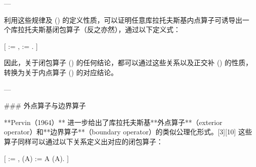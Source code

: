 ---

利用这些规律及 () 的定义性质，可以证明任意库拉托夫斯基内点算子可诱导出一个库拉托夫斯基闭包算子（反之亦然），通过以下定义式：

[
 := ,
\qquad
{} := .
]

因此，关于闭包算子 () 的任何结论，都可以通过这些关系以及正交补 () 的性质，转换为关于内点算子 () 的对应结论。

---

### 外点算子与边界算子

**Pervin（1964）** 进一步给出了库拉托夫斯基**外点算子**（exterior operator）和**边界算子**（boundary operator）的类似公理化形式。[3][10]
这些算子同样可以通过以下关系定义出对应的闭包算子：

[
 := ,
\qquad
{}(A) := A \cup {}(A).
]
